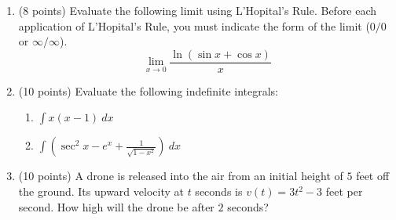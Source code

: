 \documentclass[12pt]{article}
\newcommand{\ds}{\displaystyle}
\let\ds\displaystyle
\begin{document}
\begin{enumerate}
\item  (8 points) Evaluate the following limit using L'Hopital's Rule. Before each application of L'Hopital's Rule, you must indicate the form of the limit ($0/0$ or $\infty/\infty$).\\
\vspace{.2in}
$$\lim_{x \rightarrow 0}\frac{\ln(\sin x + \cos x)}{x}$$

\vfill

\item (10 points)  Evaluate the following indefinite integrals:

\begin{enumerate}
\item $\ds \int x(x-1)\:dx$
\vfill
\item $\ds \int \left(\sec^2x - e^x + \frac{1}{\sqrt{1-x^2}}\right)\:dx$
\vfill
\end{enumerate}

\newpage
\item (10 points) A drone is released into the air from an initial height of $5$ feet off the ground. Its upward velocity at $t$ seconds is $v(t) = 3t^2 - 3$ feet per second. How high will the drone be after $2$ seconds?
\vfill

%
%
%


\end{enumerate}
\end{document}
